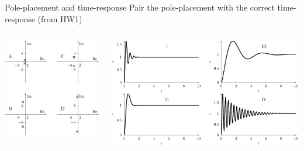 \documentclass[presentation,aspectratio=169]{beamer}
\begin{document}
\begin{frame}[label={sec:org88d54f5}]{Pole-placement and time-response}
Pair the pole-placement with the correct time-response (from HW1)
\begin{columns}
\begin{column}{0.4\columnwidth}
\begin{center}
\includegraphics[width=\linewidth]{../../figures/pzmap-apollo}
\end{center}
\end{column}
\begin{column}{0.6\columnwidth}
\begin{center}
\includegraphics[width=\linewidth]{../../figures/step-response-apollo}
\end{center}
\end{column}
\end{columns}
\end{frame}
\end{document}
